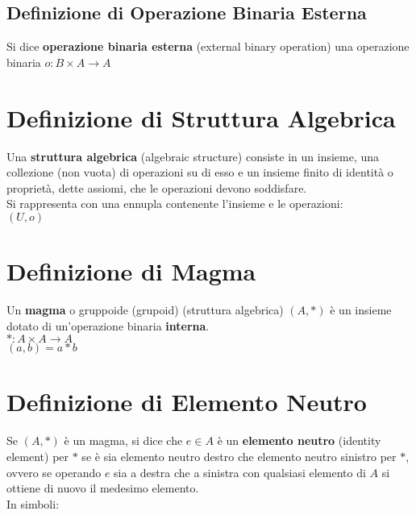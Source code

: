 \documentclass[a4paper, twoside, italian, 11pt]{book}
\begin{document}
\subsection{Definizione di Operazione Binaria Esterna}

Si dice \textbf{operazione binaria esterna} (external binary operation) una operazione binaria $o : B \times A \rightarrow A$



\section{Definizione di Struttura Algebrica}

Una \textbf{struttura algebrica} (algebraic structure) consiste in un insieme, una collezione (non vuota) di operazioni su di esso e un insieme finito di identità o proprietà, dette assiomi, che le operazioni devono soddisfare. \\

\noindent
Si rappresenta con una ennupla contenente l'insieme e le operazioni: \\

$(U, o)$



\section{Definizione di Magma}

Un \textbf{magma} o gruppoide (grupoid) (struttura algebrica) $(A, *)$ è un insieme dotato di un'operazione binaria \textbf{interna}. \\

$* : A \times A \rightarrow A$ \\
\indent
$(a, b) = a * b$ \\



\section{Definizione di Elemento Neutro}

Se $(A, *)$ è un magma, si dice che $e \in A$ è un \textbf{elemento neutro} (identity element) per $*$ se è sia elemento neutro destro che elemento neutro sinistro per $*$, ovvero se operando $e$ sia a destra che a sinistra con qualsiasi elemento di $A$ si ottiene di nuovo il medesimo elemento. \\

\noindent
In simboli:
\end{document}
